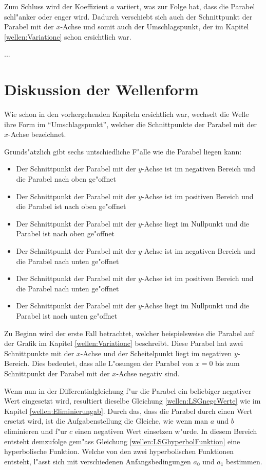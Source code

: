 \begin{refsection}
Zum Schluss wird der Koeffizient $a$ variiert, was zur Folge hat, dass die 
Parabel schl"anker oder enger wird. Dadurch verschiebt sich auch der 
Schnittpunkt der Parabel mit der $x$-Achse und somit auch der Umschlagspunkt, 
der im Kapitel \ref{wellen:Variationc} schon ersichtlich war. 

...

\section{Diskussion der Wellenform}
\label{wellen:DiskussionWellenform}

Wie schon in den vorhergehenden Kapiteln ersichtlich war, wechselt die Welle 
ihre Form im ``Umschlagspunkt'', welcher die Schnittpunkte der Parabel mit der 
$x$-Achse bezeichnet.


Grunds"atzlich gibt sechs untschiedliche F"alle wie die Parabel liegen kann:
\begin{itemize}
	\item Der Schnittpunkt der Parabel mit der $y$-Achse ist im negativen 
	Bereich und die Parabel nach oben ge"offnet
	\item Der Schnittpunkt der Parabel mit der $y$-Achse ist im positiven 
	Bereich und die Parabel ist nach oben ge"offnet
	\item Der Schnittpunkt der Parabel mit der $y$-Achse liegt im Nullpunkt und 
	die Parabel ist nach oben ge"offnet
	\item Der Schnittpunkt der Parabel mit der $y$-Achse ist im negativen 
	Bereich und die Parabel nach unten ge"offnet
	\item Der Schnittpunkt der Parabel mit der $y$-Achse ist im positiven 
	Bereich und die Parabel nach unten ge"offnet
	\item Der Schnittpunkt der Parabel mit der $y$-Achse liegt im Nullpunkt und 
	die Parabel ist nach unten ge"offnet
\end{itemize}

Zu Beginn wird der erste Fall betrachtet, welcher beispielsweise die Parabel 
auf der Grafik im Kapitel \ref{wellen:Variationc} beschreibt. Diese Parabel hat 
zwei Schnittpunkte mit der $x$-Achse und der Scheitelpunkt liegt im negativen 
$y$-Bereich. Dies bedeutet, dass alle L"osungen der Parabel von $x=0$ bis zum 
Schnittpunkt der Parabel mit der $x$-Achse negativ sind. 

Wenn nun in der Differentialgleichung f"ur die Parabel ein beliebiger negativer 
Wert eingesetzt wird, resultiert dieselbe Gleichung \ref{wellen:LSGnegcWerte} 
wie im Kapitel \ref{wellen:Eliminierungab}. Durch das, dass die Parabel durch 
einen Wert ersetzt wird, ist die Aufgabenstellung die Gleiche, wie wenn man $a$ 
und $b$ eliminieren und f"ur $c$ einen negativen Wert einsetzen w"urde. In 
diesem Bereich entsteht demzufolge gem"ass Gleichung 
\ref{wellen:LSGhyperbolFunktion} eine hyperbolische Funktion. Welche von den 
zwei hyperbolischen Funktionen entsteht, l"asst sich mit verschiedenen 
Anfangsbedingungen $a_0$ und $a_1$ bestimmen.


\end{refsection}
